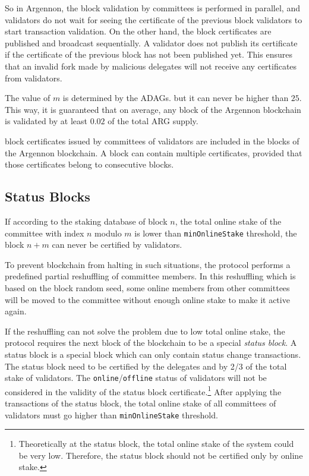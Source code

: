 So in Argennon, the block validation by committees is performed in parallel, and validators
do not wait for seeing the certificate of the previous block validators to start transaction validation. On the
other hand, the block certificates are published and broadcast sequentially. A validator does not publish its
certificate if the certificate of the previous block has not been published yet. This ensures that an invalid
fork made by malicious delegates will not receive any certificates from validators.

The value of $m$ is determined by the ADAGs. but it can never be higher than $25$. This way, it is guaranteed
that on average, any block of the Argennon blockchain is validated by at least $0.02$ of the total ARG supply.

block certificates issued by committees of validators are included in the blocks of the Argennon blockchain.
A block can contain multiple certificates, provided that
those certificates belong to consecutive blocks.

\subsection{Status Blocks}\label{subsec:status-blocks}

If according to the staking database of block $n$, the total online stake of the committee with index $n$ modulo $m$ is
lower than \texttt{minOnlineStake} threshold, the block $n + m$ can never be certified by validators.

To prevent blockchain from halting in such situations, the protocol performs a predefined partial
reshuffling of committee members.
In this reshuffling which is based on the block random seed, some online members from other committees will
be moved to the committee without enough online stake to make it active again.

If the reshuffling can not solve the problem due to low total online stake, the protocol requires the next block
of the blockchain to be a special \emph{status block}. A status block is a special block which can only contain
status change transactions. The status block need to be certified by the delegates and by 2/3 of the total stake of
validators. The \texttt{online}/\texttt{offline} status of validators will not be considered in the validity of
the status block certificate.\footnote{Theoretically at the status block, the total online stake of the system could
be very low. Therefore, the status block should not be certified only by online stake.} After applying
the transactions of the status block, the total online stake of all committees of validators
must go higher than \texttt{minOnlineStake} threshold.

